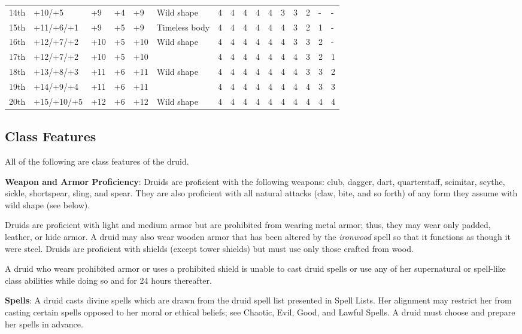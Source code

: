 \begin{table*}[]
\begin{tabularx}{\linewidth}{lp{6em}p{2.5em}p{2.5em}p{2.5em}Xllllllllll}
14th & +10/+5 & +9 & +4 & +9 & Wild shape & 4 & 4 & 4 & 4 & 4 & 3 & 3 & 2 & - & -\\
15th & +11/+6/+1 & +9 & +5 & +9 & Timeless body & 4 & 4 & 4 & 4 & 4 & 4 & 3 & 2 & 1 & -\\
16th & +12/+7/+2 & +10 & +5 & +10 & Wild shape & 4 & 4 & 4 & 4 & 4 & 4 & 3 & 3 & 2 & -\\
17th & +12/+7/+2 & +10 & +5 & +10 &  & 4 & 4 & 4 & 4 & 4 & 4 & 4 & 3 & 2 & 1\\
18th & +13/+8/+3 & +11 & +6 & +11 & Wild shape & 4 & 4 & 4 & 4 & 4 & 4 & 4 & 3 & 3 & 2\\
19th & +14/+9/+4 & +11 & +6 & +11 &  & 4 & 4 & 4 & 4 & 4 & 4 & 4 & 4 & 3 & 3\\
20th & +15/+10/+5 & +12 & +6 & +12 & Wild shape & 4 & 4 & 4 & 4 & 4 & 4 & 4 & 4 & 4 & 4\\
\end{tabularx}
\end{table*}


				
\subsection{Class Features}

				
All of the following are class features of the druid.
				
\textbf{Weapon and Armor Proficiency}: Druids are proficient with the following weapons: club, dagger, dart, quarterstaff, scimitar, scythe, sickle, shortspear, sling, and spear. They are also proficient with all natural attacks (claw, bite, and so forth) of any form they assume with wild shape (see below).
				
Druids are proficient with light and medium armor but are prohibited from wearing metal armor; thus, they may wear only padded, leather, or hide armor. A druid may also wear wooden armor that has been altered by the \textit{ironwood} spell so that it functions as though it were steel. Druids are proficient with shields (except tower shields) but must use only those crafted from wood.
				
A druid who wears prohibited armor or uses a prohibited shield is unable to cast druid spells or use any of her supernatural or spell-like class abilities while doing so and for 24 hours thereafter.
				
\textbf{Spells}: A druid casts divine spells which are drawn from the druid spell list presented in Spell Lists. Her alignment may restrict her from casting certain spells opposed to her moral or ethical beliefs; see Chaotic, Evil, Good, and Lawful Spells. A druid must choose and prepare her spells in advance.
				
